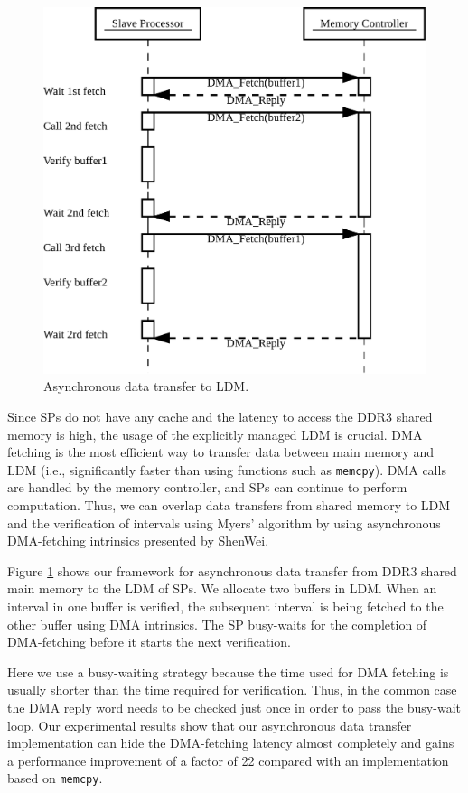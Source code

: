 \begin{figure}[!htb]
  \includegraphics[width=1\linewidth]{figures/AsyncTrans}
  \caption{Asynchronous data transfer to LDM.}
  \label{AsyncTrans}
\end{figure}

Since SPs do not have any cache and the latency to access the DDR3
shared memory is high, the usage of the explicitly managed LDM is
crucial.  DMA fetching is the most efficient way to transfer data
between main memory and LDM (i.e., significantly faster than using
functions such as \texttt{memcpy}). DMA calls are handled by the
memory controller, and SPs can continue to perform computation. Thus,
we can overlap data transfers from shared memory to LDM and the
verification of intervals using Myers' algorithm by using asynchronous
DMA-fetching intrinsics presented by ShenWei.

Figure \ref{AsyncTrans} shows our framework for asynchronous data
transfer from DDR3 shared main memory to the LDM of SPs. We allocate
two buffers in LDM. When an interval in one buffer is verified, the
subsequent interval is being fetched to the other buffer using DMA
intrinsics. The SP busy-waits for the completion of DMA-fetching
before it starts the next verification.

Here we use a busy-waiting strategy because the time used for DMA
fetching is usually shorter than the time required for
verification. Thus, in the common case the DMA reply word needs to be
checked just once in order to pass the busy-wait loop. Our
experimental results show that our asynchronous data transfer
implementation can hide the DMA-fetching latency almost completely and
gains a performance improvement of a factor of 22 compared with an
implementation based on \texttt{memcpy}.
